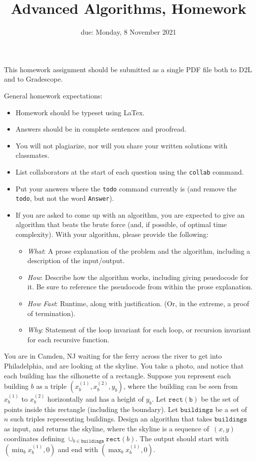 \documentclass{article}
\title{Advanced Algorithms, Homework \hwnum}
\author{\todo{Your Name Here}}
\date{due: Monday, 8 November 2021}
\begin{document}
\maketitle

This homework assignment should be
submitted as a single PDF file both to D2L and to Gradescope.

General homework expectations:
\begin{itemize}
    \item Homework should be typeset using LaTex.
    \item Answers should be in complete sentences and proofread.
    \item You will not plagiarize, nor will you share your written solutions
        with classmates.
    \item List collaborators at the start of each question using the
        \texttt{collab} command.
    \item Put your answers where the \texttt{todo} command currently is (and
        remove the \texttt{todo}, but not the word \texttt{Answer}).
    \item If you are asked to come up with an algorithm, you are
        expected to give an algorithm that beats the brute force (and, if possible, of
        optimal time complexity). With your algorithm, please provide the following:
        \begin{itemize}
            \item \emph{What}: A prose explanation of the problem and the algorithm,
                including a description of the input/output.
            \item \emph{How}: Describe how the algorithm works, including giving
                psuedocode for it.  Be sure to reference the pseudocode
                from within the prose explanation.
            \item \emph{How Fast}: Runtime, along with justification.  (Or, in the
                extreme, a proof of termination).
            \item \emph{Why}: Statement of the loop invariant for each loop, or
                recursion invariant for each recursive function.
        \end{itemize}
\end{itemize}

\collab{\todo{}}

You are in Camden, NJ waiting for the ferry across the river to
get into Philadelphia, and are looking at the skyline.  You take a photo, and notice that each building
has the silhouette of a rectangle.  Suppose you  represent each building $b$ as a
triple $(x_b^{(1)},x_b^{(2)},y_b)$, where the building can be seen from $x_b^{(1)}$ to $x_b^{(2)}$
horizontally and has a height of $y_b$.  Let $\mathtt{rect(b)}$ be the set of
points inside this rectangle (including the boundary).  Let $\mathtt{buildings}$
be a set of $n$ such triples representing buildings. Design an algorithm that takes $\mathtt{buildings}$ as input, and
returns the skyline, where the skyline is a sequence of~$(x,y)$ coordinates
defining $\cup_{b \in \mathtt{buildings}} \mathtt{rect}(b)$.  The output should
start with $(\min_b{x_b^{(1)}},0)$ and end with $(\max_b{x_b^{(1)}},0)$.
\end{document}
